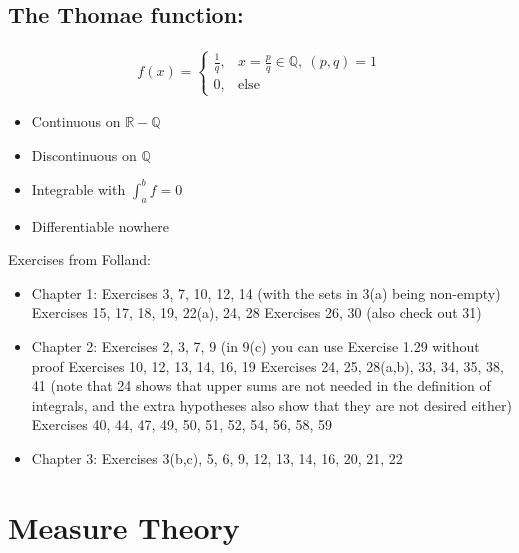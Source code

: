\hypertarget{the-thomae-function}{%
\subsection{The Thomae function:}\label{the-thomae-function}}

\begin{align*}
f ( x ) = \begin{cases}
\frac 1 q, & x = \frac p q \in {\mathbb{Q}},~(p,q) = 1 \\
0, & \text{else}
\end{cases}
\end{align*}

\begin{itemize}
\tightlist
\item
  Continuous on \({\mathbb{R}}-{\mathbb{Q}}\)
\item
  Discontinuous on \({\mathbb{Q}}\)
\item
  Integrable with \(\int_a^b f = 0\)
\item
  Differentiable nowhere
\end{itemize}

Exercises from Folland:

\begin{itemize}
\item
  Chapter 1: Exercises 3, 7, 10, 12, 14 (with the sets in 3(a) being
  non-empty) Exercises 15, 17, 18, 19, 22(a), 24, 28 Exercises 26, 30
  (also check out 31)
\item
  Chapter 2: Exercises 2, 3, 7, 9 (in 9(c) you can use Exercise 1.29
  without proof Exercises 10, 12, 13, 14, 16, 19 Exercises 24, 25,
  28(a,b), 33, 34, 35, 38, 41 (note that 24 shows that upper sums are
  not needed in the definition of integrals, and the extra hypotheses
  also show that they are not desired either) Exercises 40, 44, 47, 49,
  50, 51, 52, 54, 56, 58, 59
\item
  Chapter 3: Exercises 3(b,c), 5, 6, 9, 12, 13, 14, 16, 20, 21, 22
\end{itemize}

\hypertarget{measure-theory-1}{%
\section{Measure Theory}\label{measure-theory-1}}

